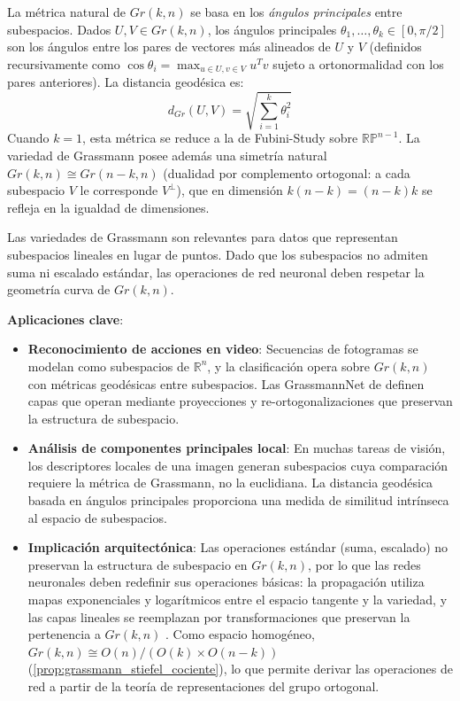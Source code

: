 La métrica natural de $Gr(k,n)$ se basa en los \textit{ángulos principales} entre subespacios. Dados $U, V \in Gr(k,n)$, los ángulos principales $\theta_1, \ldots, \theta_k \in [0, \pi/2]$ son los ángulos entre los pares de vectores más alineados de $U$ y $V$ (definidos recursivamente como $\cos \theta_i = \max_{u \in U, v \in V} u^T v$ sujeto a ortonormalidad con los pares anteriores). La distancia geodésica es:
\[
d_{Gr}(U, V) = \sqrt{\sum_{i=1}^{k} \theta_i^2}
\]
Cuando $k = 1$, esta métrica se reduce a la de Fubini-Study sobre $\mathbb{RP}^{n-1}$. La variedad de Grassmann posee además una simetría natural $Gr(k,n) \cong Gr(n-k,n)$ (dualidad por complemento ortogonal: a cada subespacio $V$ le corresponde $V^\perp$), que en dimensión $k(n-k) = (n-k)k$ se refleja en la igualdad de dimensiones.

Las variedades de Grassmann son relevantes para datos que representan subespacios lineales en lugar de puntos. Dado que los subespacios no admiten suma ni escalado estándar, las operaciones de red neuronal deben respetar la geometría curva de $Gr(k,n)$.

\textbf{Aplicaciones clave}:
\begin{itemize}
    \item \textbf{Reconocimiento de acciones en video}: Secuencias de fotogramas se modelan como subespacios de $\mathbb{R}^n$, y la clasificación opera sobre $Gr(k,n)$ con métricas geodésicas entre subespacios. Las GrassmannNet de \citet{huang2017grassmann} definen capas que operan mediante proyecciones y re-ortogonalizaciones que preservan la estructura de subespacio.

    \item \textbf{Análisis de componentes principales local}: En muchas tareas de visión, los descriptores locales de una imagen generan subespacios cuya comparación requiere la métrica de Grassmann, no la euclidiana. La distancia geodésica basada en ángulos principales proporciona una medida de similitud intrínseca al espacio de subespacios.

    \item \textbf{Implicación arquitectónica}: Las operaciones estándar (suma, escalado) no preservan la estructura de subespacio en $Gr(k,n)$, por lo que las redes neuronales deben redefinir sus operaciones básicas: la propagación utiliza mapas exponenciales y logarítmicos entre el espacio tangente y la variedad, y las capas lineales se reemplazan por transformaciones que preservan la pertenencia a $Gr(k,n)$ \citep{huang2017grassmann}. Como espacio homogéneo, $Gr(k,n) \cong O(n)/(O(k) \times O(n-k))$ (\autoref{prop:grassmann_stiefel_cociente}), lo que permite derivar las operaciones de red a partir de la teoría de representaciones del grupo ortogonal.
\end{itemize}


